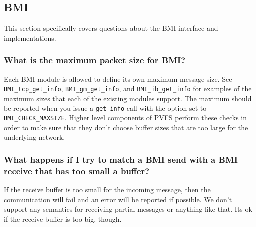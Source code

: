 \documentclass[11pt,letterpaper]{article}
\begin{document}
\subsection{BMI}

This section specifically covers questions about the BMI interface and
implementations.

\subsubsection{What is the maximum packet size for BMI?}

Each BMI module is allowed to define its own maximum message size.  See
\texttt{BMI\_tcp\_get\_info}, \texttt{BMI\_gm\_get\_info}, and
\texttt{BMI\_ib\_get\_info} for examples of the maximum sizes that each of the
existing modules support.  The maximum should be reported when you issue a
\texttt{get\_info} call with the option set to \texttt{BMI\_CHECK\_MAXSIZE}.
Higher level components of PVFS perform these checks in order to make sure
that they don't choose buffer sizes that are too large for the underlying
network.

\subsubsection{What happens if I try to match a BMI send with a BMI receive
               that has too small a buffer?}

If the receive buffer is too small for the incoming message, then the
communication will fail and an error will be reported if possible.  We
don't support any semantics for receiving partial messages or anything like
that.  Its ok if the receive buffer is too big, though.
    
\end{document}
